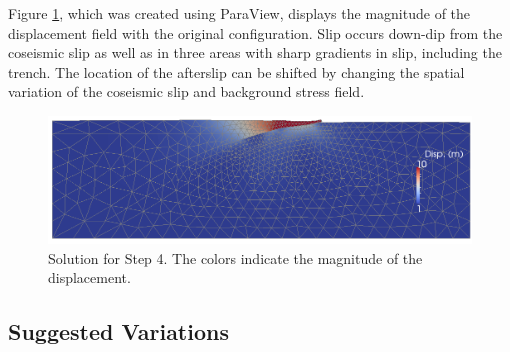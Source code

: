 Figure \ref{fig:tutorial:subduction:step04}, which was created using
ParaView, displays the magnitude of the displacement field with the
original configuration. Slip occurs down-dip from the coseismic slip
as well as in three areas with sharp gradients in slip, including
the trench. The location of the afterslip can be shifted by changing
the spatial variation of the coseismic slip and background stress
field.

\noindent \begin{center}
\begin{figure}
\begin{centering}
\includegraphics[width=4.5in]{tutorials/subduction/figs/step01_soln}
\par\end{centering}

\caption{Solution for Step 4. The colors indicate the magnitude of the displacement.
\label{fig:tutorial:subduction:step04}}
\end{figure}

\par\end{center}


\subsection{Suggested Variations}

